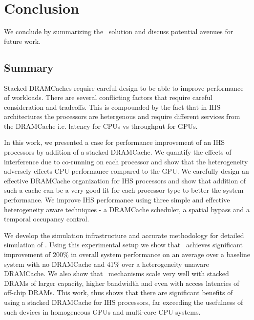 \chapter{Conclusion} \label{chap:conclusion}
We conclude by summarizing the \cachename\ solution and discuss potential avenues for future work.
\section{Summary}
Stacked DRAMCaches require careful design to be able to improve performance of workloads. There are several conflicting factors that require careful consideration and tradeoffs. This is compounded by the fact that in IHS architectures the processors are hetergenous and require different services from the DRAMCache i.e. latency for CPUs vs throughput for GPUs.
\par In this work, we presented a case for performance improvement of an IHS processors by addition of a stacked DRAMCache. 
We quantify the effects of interference due to co-running on each processor and show that the heterogeneity adversely effects CPU performance compared to the GPU. 
We carefully design an effective DRAMCache organization for IHS processors and show that addition of such a cache can be a very good fit for each processor type to better the system performance.
We improve IHS performance using three simple and effective heterogeneity aware techniques - a DRAMCache scheduler, a spatial bypass and a temporal occupancy control. 
\par We develop the simulation infrastructure and accurate methodology for detailed simulation of \cachename. Using this experimental setup we show that 
\cachename\ achieves significant improvement of 200\% in overall system performance on an average over a baseline system with no DRAMCache and 41\% over a heterogeneity unaware DRAMCache. 
We also show that \cachename\ mechanisms scale very well with stacked DRAMs of larger capacity, higher bandwidth and even with access latencies of off-chip DRAMs.
This work, thus shows that there are significant benefits of using a stacked DRAMCache for IHS processors, far exceeding the usefulness of such devices in homogeneous GPUs and multi-core CPU systems.

